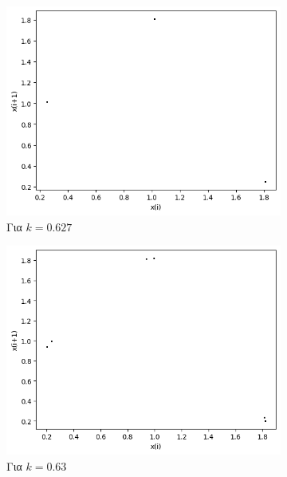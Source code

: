 \begin{figure}[ht]
\begin{subfigure}[b]{0.4\textwidth}
		\includegraphics[width=\textwidth]{LateX images/graphs q07/g10}
		\caption{Για $k=0.627$}
		\label{f:k44}
	\end{subfigure}
	\hfill
	\begin{subfigure}[b]{0.4\textwidth}
		\centering
		\includegraphics[width=\textwidth]{LateX images/graphs q07/g11}
		\caption{Για $k=0.63$}
		\label{f:k45}
	\end{subfigure}
	\hfill
	\begin{subfigure}[b]{0.4\textwidth}
		\centering

\end{subfigure}
\end{figure}
